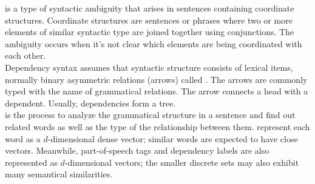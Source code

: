\documentclass{article}
\begin{document}
 is a type of syntactic ambiguity that arises in sentences containing coordinate structures. Coordinate structures are sentences or phrases where two or more elements of similar syntactic type are joined together using conjunctions. The ambiguity occurs when it's not clear which elements are being coordinated with each other. \\ 

Dependency syntax assumes that syntactic structure consists of lexical items, normally binary asymmetric relations (arrows) called . The arrows are commonly typed with the name of grammatical relations. The arrow connects a head with a dependent. Usually, dependencies form a tree. \\ 

 is the process to analyze the grammatical structure in a sentence and find out related words as well as the type of the relationship between them.  represent each word as a $d$-dimensional dense vector; similar words are expected to have close vectors. Meanwhile, part-of-speech tags and dependency labels are also represented as $d$-dimensional vectors; the smaller discrete sets may also exhibit many semantical similarities. \\ 
\end{document}

